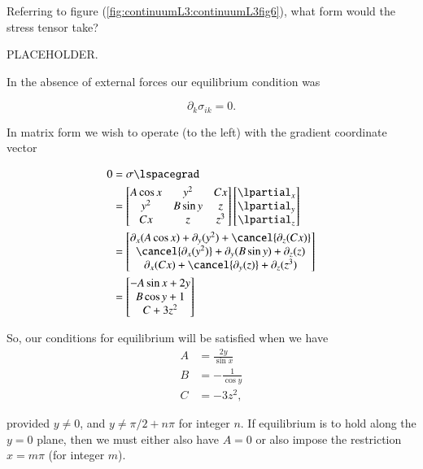 \begin{Exercise}[title={Compute stress tensors for some typical 3D forces}, label={problem:stressFIXME:p2}]

Referring to figure (\ref{fig:continuumL3:continuumL3fig6}), what form would the stress tensor take?

PLACEHOLDER.


\end{Exercise}

\begin{Answer}[ref={problem:continuumProblemSet1:q4}]
In the absence of external forces our equilibrium condition was

\begin{equation}\label{eqn:continuumProblemSet1:530}
\partial_k \sigma_{ik} = 0.
\end{equation}

In matrix form we wish to operate (to the left) with the gradient coordinate vector

\begin{align*}
0 
&= \sigma \lspacegrad \\
&=
\begin{bmatrix}
A \cos x & y^2 & C x \\
y^2 & B \sin y & z \\
C x & z & z^3
\end{bmatrix}
\begin{bmatrix}
\lpartial_x \\
\lpartial_y \\
\lpartial_z \\
\end{bmatrix} \\
&=
\begin{bmatrix}
\partial_x (A \cos x) + \partial_y(y^2) + \cancel{\partial_z(C x)} \\
\cancel{\partial_x (y^2)} + \partial_y(B \sin y) + \partial_z(z) \\
\partial_x (C x) + \cancel{\partial_y(z)} + \partial_z(z^3)
\end{bmatrix} \\
&=
\begin{bmatrix}
-A \sin x + 2 y \\
B \cos y + 1 \\
C + 3 z^2 
\end{bmatrix} \\
\end{align*}

So, our conditions for equilibrium will be satisfied when we have
\begin{align}\label{eqn:continuumProblemSet1:550}
A &= \frac{2 y }{\sin x} \\
B &= -\frac{1}{\cos y} \\
C &= -3 z^2,
\end{align}

provided $y \ne 0$, and $y \ne \pi/2 + n\pi$ for integer $n$.  If equilibrium is to hold along the $y = 0$ plane, then we must either also have $A = 0$ or also impose the restriction $x = m \pi$ (for integer $m$).

\end{Answer}
